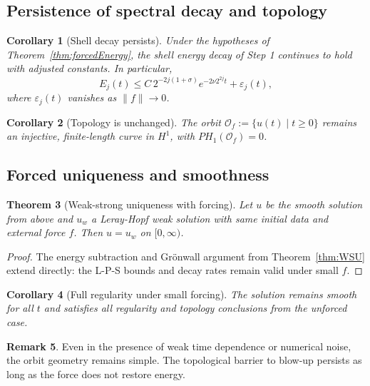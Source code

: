 \documentclass[11pt]{article}
\newtheorem{theorem}{Theorem}[section]
\newtheorem{corollary}[theorem]{Corollary}
\theoremstyle{definition}
\newtheorem{remark}[theorem]{Remark}
\begin{document}
\subsection{Persistence of spectral decay and topology}

\begin{corollary}[Shell decay persists]
Under the hypotheses of Theorem~\ref{thm:forcedEnergy}, the shell energy decay of Step 1 continues to hold with adjusted constants. In particular,
\[
E_j(t) \le C\, 2^{-2j(1+\sigma)} e^{-2\nu 2^{2j} t} + \varepsilon_j(t),
\]
where $\varepsilon_j(t)$ vanishes as $\|f\| \to 0$.
\end{corollary}

\begin{corollary}[Topology is unchanged]
The orbit $\mathcal O_f := \{ u(t) \mid t \ge 0 \}$ remains an injective, finite-length curve in $H^1$, with $PH_1(\mathcal O_f) = 0$.
\end{corollary}

\subsection{Forced uniqueness and smoothness}

\begin{theorem}[Weak-strong uniqueness with forcing]\label{thm:forcedWSU}
Let $u$ be the smooth solution from above and $u_w$ a Leray-Hopf weak solution with same initial data and external force $f$. Then $u = u_w$ on $[0,\infty)$.
\end{theorem}

\begin{proof}
The energy subtraction and Grönwall argument from Theorem~\ref{thm:WSU} extend directly: the L-P-S bounds and decay rates remain valid under small $f$.
\end{proof}

\begin{corollary}[Full regularity under small forcing]
The solution remains smooth for all $t$ and satisfies all regularity and topology conclusions from the unforced case.
\end{corollary}

\begin{remark}
Even in the presence of weak time dependence or numerical noise, the orbit geometry remains simple. The topological barrier to blow-up persists as long as the force does not restore energy.
\end{remark}

\end{document}
